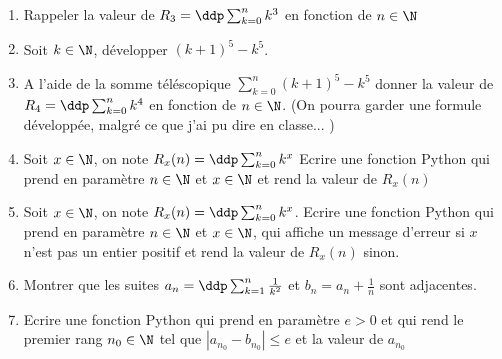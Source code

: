 



\begin{exercice}
\begin{enumerate}
\item Rappeler  la valeur  de $ R_3=\ddp \sum_{k=0}^n k^3$ en fonction de $n\in \N$
\item Soit $k\in \N$, développer $(k+1)^5 -k^5$. 
\item A l'aide de la  somme téléscopique  $\sum_{k=0}^n(k+1)^5 -k^5$ donner la valeur de 
$R_4= \ddp \sum_{k=0}^n k^4$  en fonction de $n\in \N$.  (On pourra garder une formule développée, malgré ce que j'ai pu dire en classe... ) 
\item Soit $x\in \N$, on note $R_x(n) =  \ddp \sum_{k=0}^n k^x$
Ecrire une fonction Python qui prend en paramètre $n\in \N $ et $x\in \N $  et rend la valeur de $R_x(n)$
\item Soit $x\in \N$, on note $R_x(n) =  \ddp \sum_{k=0}^n k^x$. 
Ecrire une fonction Python qui prend en paramètre $n\in \N $ et $x\in \N $, qui affiche un message d'erreur si $x$ n'est pas un entier positif et rend la valeur de $R_x(n)$ sinon. 

\item Montrer que les suites $ a_n=\ddp \sum_{k=1}^n \frac{1}{k^2}$  et $b_n= a_n + \frac{1}{n}$ sont adjacentes. 

\item  Ecrire une fonction   Python qui prend en paramètre $e>0$ et qui rend le premier rang $n_0\in \N$ tel que $\left|a_{n_0}-b_{n_0}\right| \leq e$
et la valeur de $a_{n_0}$
\end{enumerate}
\end{exercice}

